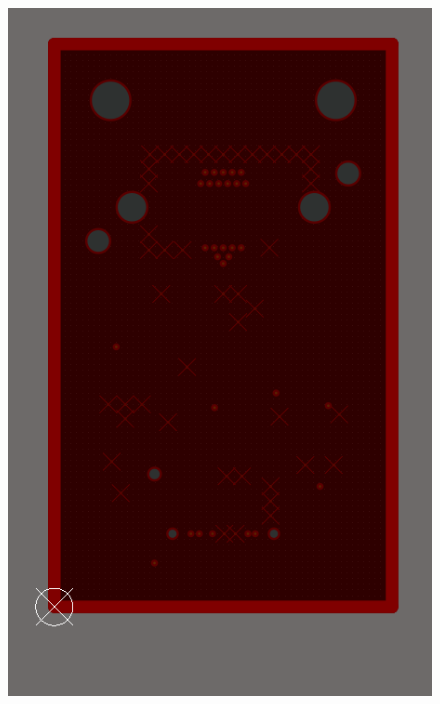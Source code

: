 \documentclass[a4paper,11pt]{article}
\begin{document}
\begin{figure}[htbp]
\centering
\includegraphics[scale=0.5]{PulserBoard0.9InnerBottomLayer.png}
\qquad

\end{figure}
\end{document}
